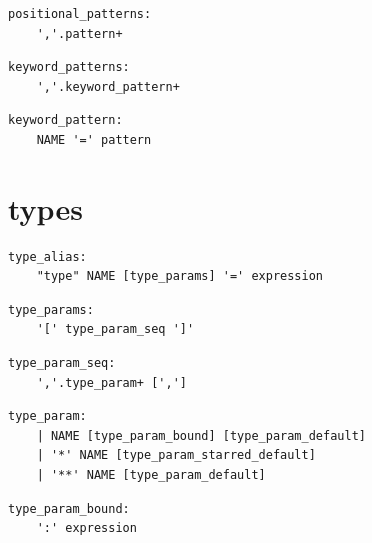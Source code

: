 \noindent\textbf{\texttt{}}\par
\begin{lstlisting}
positional_patterns:
    ','.pattern+
\end{lstlisting}

\noindent\textbf{\texttt{}}\par
\begin{lstlisting}
keyword_patterns:
    ','.keyword_pattern+
\end{lstlisting}

\noindent\textbf{\texttt{}}\par
\begin{lstlisting}
keyword_pattern:
    NAME '=' pattern
\end{lstlisting}

\section{types}

\noindent\textbf{\texttt{}}\par
\begin{lstlisting}
type_alias:
    "type" NAME [type_params] '=' expression
\end{lstlisting}

\noindent\textbf{\texttt{}}\par
\begin{lstlisting}
type_params:
    '[' type_param_seq ']'
\end{lstlisting}

\noindent\textbf{\texttt{}}\par
\begin{lstlisting}
type_param_seq:
    ','.type_param+ [',']
\end{lstlisting}

\noindent\textbf{\texttt{}}\par
\begin{lstlisting}
type_param:
    | NAME [type_param_bound] [type_param_default]
    | '*' NAME [type_param_starred_default]
    | '**' NAME [type_param_default]
\end{lstlisting}

\noindent\textbf{\texttt{}}\par
\begin{lstlisting}
type_param_bound:
    ':' expression
\end{lstlisting}

